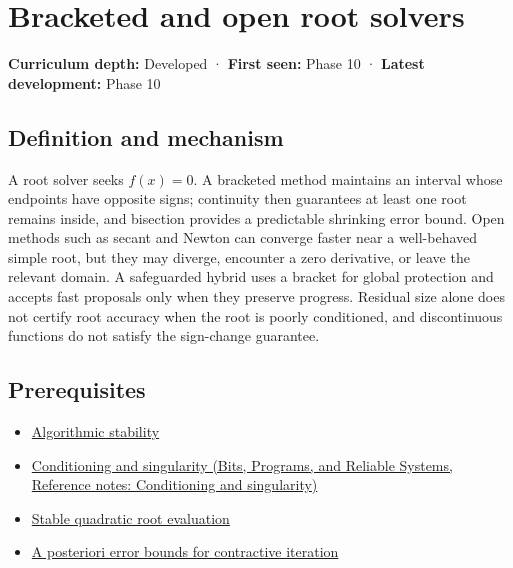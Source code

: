 \hypertarget{appendix-f63eb850796d}{}\label{referencestart:appendix-f63eb850796d}
\section{Bracketed and open root solvers}\label{appendix-f63eb850796d-bracketed-and-open-root-solvers}

\textbf{Curriculum depth:} Developed · \textbf{First seen:} Phase 10 · \textbf{Latest development:} Phase 10

\begin{allmightroledefinition}

\subsection{Definition and mechanism}\label{appendix-f63eb850796d-definition-and-mechanism}

A root solver seeks \(f(x)=0\). A bracketed method maintains an interval whose endpoints have opposite signs; continuity then guarantees at least one root remains inside, and bisection provides a predictable shrinking error bound. Open methods such as secant and Newton can converge faster near a well-behaved simple root, but they may diverge, encounter a zero derivative, or leave the relevant domain. A safeguarded hybrid uses a bracket for global protection and accepts fast proposals only when they preserve progress. Residual size alone does not certify root accuracy when the root is poorly conditioned, and discontinuous functions do not satisfy the sign-change guarantee.

\end{allmightroledefinition}

\subsection{Prerequisites}\label{appendix-f63eb850796d-prerequisites}

\begin{itemize}
\tightlist
\item
  \hyperref[appendix-aa2bf0d79639]{Algorithmic stability}
\item
  \href{../01-Bits-Programs-and-Reliable-Systems/main.pdf\#nameddest=appendix-8f6a01f284a7}{Conditioning and singularity (Bits, Programs, and Reliable Systems, Reference notes: Conditioning and singularity)}
\item
  \hyperref[appendix-b9afba7f63e5]{Stable quadratic root evaluation}
\item
  \hyperref[appendix-d83b0ad1be7f]{A posteriori error bounds for contractive iteration}
\end{itemize}

